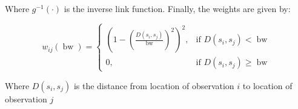 \documentclass[10pt]{amsart}
\DeclareMathOperator*{\bw}{\mbox{bw}}
\begin{document}
		Where $g^{-1}(\cdot)$ is the inverse link function. Finally, the weights are given by:
		
		\[
			w_{ij}(\bw) =  \begin{cases} \left(1-\left(\frac{D(s_i,s_j)}{\bw}\right)^2\right)^2, & \mbox{if } D(s_i,s_j) < \bw \\
			0, & \mbox{if }D(s_i,s_j) \ge \bw \end{cases}
		\]		
		
		Where $D(s_i,s_j)$ is the distance from location of observation $i$ to location of observation $j$

		


\end{document}
